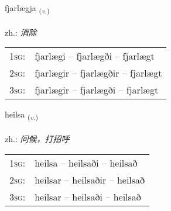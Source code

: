 \documentclass[frontgrid, backgrid]{flacards}\usepackage[]{graphicx}\usepackage[]{xcolor}
\begin{document}
\renewcommand{\flhead}{\vskip5pt \fboxsep=0pt {\small\bfseries\footnotesize Sagnorð | 动词}}
\renewcommand{\fcfoot}{\vskip5pt \fboxsep=0pt \hspace{2pt}{\small\bfseries\footnotesize 3K}}

\renewcommand{\blhead}{\vskip5pt {\small\bfseries\footnotesize Sagnorð | 动词 }}
\renewcommand{\bcfoot}{\vskip5pt \hspace{2pt}{\small\bfseries\footnotesize 3K}}


{fjarlægja \small{\textsubscript{(\textit{v.})}} \\[1ex] %
\textphonetic{[fjarlaija]} \\
zh.: \emph{消除} \\  [2ex]
\renewcommand*{\arraystretch}{0.8}
\begin{tabular}{p{1cm}l}
\textsc{1sg}: & fjarlægi -- fjarlægði -- fjarlægt \\ 
\textsc{2sg}: & fjarlægir -- fjarlægðir -- fjarlægt \\ 
\textsc{3sg}: & fjarlægir -- fjarlægði -- fjarlægt \\ 
\end{tabular}
}

\renewcommand{\flhead}{\vskip5pt \fboxsep=0pt {\small\bfseries\footnotesize Sagnorð | 动词}}
\renewcommand{\fcfoot}{\vskip5pt \fboxsep=0pt \hspace{2pt}{\small\bfseries\footnotesize 3K}}

\renewcommand{\blhead}{\vskip5pt {\small\bfseries\footnotesize Sagnorð | 动词 }}
\renewcommand{\bcfoot}{\vskip5pt \hspace{2pt}{\small\bfseries\footnotesize 3K}}


{heilsa \small{\textsubscript{(\textit{v.})}} \\[1ex] %
\textphonetic{[heilsa]} \\
zh.: \emph{问候，打招呼} \\  [2ex]
\renewcommand*{\arraystretch}{0.8}
\begin{tabular}{p{1cm}l}
\textsc{1sg}: & heilsa -- heilsaði -- heilsað \\ 
\textsc{2sg}: & heilsar -- heilsaðir -- heilsað \\ 
\textsc{3sg}: & heilsar -- heilsaði -- heilsað \\ 
\end{tabular}
}
\end{document}
